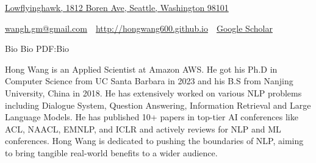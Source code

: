 \documentclass[letterpaper,MMMyyyy,nonstopmode]{simpleresumecv}
\newcommand{\CVAuthor}{Hong Wang}
\newcommand{\CVWebpage}{http://hongwang600.github.io}
\begin{document}

\Title{\CVAuthor}

\begin{SubTitle}
\href{https://www.google.com/maps/place/Phelps+Hall/@34.4161308,-119.8468366,17z/data=!3m1!4b1!4m5!3m4!1s0x80e93f7042b51aa9:0xc80cbd08cacd9e49!8m2!3d34.4161308!4d-119.8446426}
{Lowflyinghawk, 1812 Boren Ave, Seattle, Washington 98101}
\par
\href{mailto:wangh.gm@gmail.com}
{wangh.gm@gmail.com}
\,\SubBulletSymbol\,
\href{\CVWebpage}
{\url{\CVWebpage}}
\,\SubBulletSymbol\,
\href{https://scholar.google.com/citations?user=M9uQHIUAAAAJ&hl=en&authuser=1#}
{Google Scholar}
\end{SubTitle}

\begin{Body}





\Section
{Bio}
{Bio}
{PDF:Bio}

\Entry
Hong Wang is an Applied Scientist at Amazon AWS. He got his Ph.D in Computer Science from UC Santa Barbara in 2023 and his B.S from Nanjing University, China in 2018. He has extensively worked on various NLP problems including Dialogue System, Question Answering, Information Retrieval and Large Language Models. He has published 10+ papers in top-tier AI conferences like ACL, NAACL, EMNLP, and ICLR and actively reviews for NLP and ML conferences. Hong Wang is dedicated to pushing the boundaries of NLP, aiming to bring tangible real-world benefits to a wider audience.




\end{Body}
\end{document}
